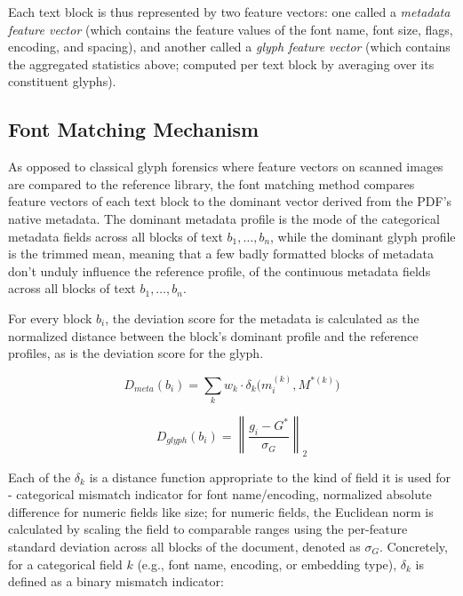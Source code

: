 \noindent Each text block is thus represented by two feature vectors: one called a \emph{metadata feature vector} (which contains the feature values of the font name, font size, flags, encoding, and spacing), and another called a \emph{glyph feature vector} (which contains the aggregated statistics above; computed per text block by averaging over its constituent glyphs).

\subsection{Font Matching Mechanism}

As opposed to classical glyph forensics \cite{Bertrand2013Intrinsic,Bertrand2015CRF} where feature vectors on scanned images are compared to the reference library, the font matching method compares feature vectors of each text block to the dominant vector derived from the PDF's native metadata. The dominant metadata profile is the mode of the categorical metadata fields across all blocks of text \(b_1, \dots, b_n\), while the dominant glyph profile is the trimmed mean, meaning that a few badly formatted blocks of metadata don't unduly influence the reference profile, of the continuous metadata fields across all blocks of text \(b_1, \dots, b_n\).

\noindent For every block \(b_i\), the deviation score for the metadata is calculated as the normalized distance between the block's dominant profile and the reference profiles, as is the deviation score for the glyph.

\begin{equation}
D_{meta}(b_i) = \sum_{k} w_k \cdot \delta_k\big(m_i^{(k)}, M^{*(k)}\big)
\label{eq:dmeta}
\end{equation}

\begin{equation}
D_{glyph}(b_i) = \left\lVert \frac{g_i - G^{*}}{\sigma_G} \right\rVert_2
\end{equation}

\noindent Each of the \(\delta_k\) is a distance function appropriate to the kind of field it is used for - categorical mismatch indicator for font name/encoding, normalized absolute difference for numeric fields like size; for numeric fields, the Euclidean norm is calculated by scaling the field to comparable ranges using the per-feature standard deviation across all blocks of the document, denoted as \(\sigma_G\). Concretely, for a categorical field \(k\) (e.g., font name, encoding, or embedding type), \(\delta_k\) is defined as a binary mismatch indicator:

